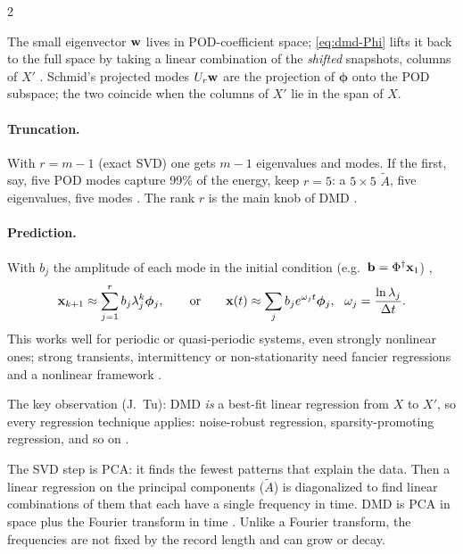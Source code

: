 \begin{paracol}{2}
\begin{intuition}
The small eigenvector $\mathbf{w}$ lives in POD-coefficient space; \eqref{eq:dmd-Phi} lifts it back to the
full space by taking a linear combination of the \emph{shifted} snapshots, columns of $X'$
. Schmid's projected modes $U_r\mathbf{w}$ are the projection of $\boldsymbol\phi$ onto the POD
subspace; the two coincide when the columns of $X'$ lie in the span of $X$.
\end{intuition}

\paragraph{Truncation.} With $r=m-1$ (exact SVD) one gets $m-1$ eigenvalues and modes. If the first,
say, five POD modes capture 99\% of the energy, keep $r=5$: a $5\times5$ $\tilde A$, five eigenvalues,
five modes . The rank $r$ is the main knob of DMD .

\paragraph{Prediction.} With $b_j$ the amplitude of each mode in the initial condition (e.g.\
$\mathbf{b}=\Phi^\dagger\mathbf{x}_1$) ,
\begin{equation}\label{eq:dmd-pred}
  \vb x_{k+1}\approx\sum_{j=1}^r b_j\lambda_j^{k}\boldsymbol\phi_j,
  \qquad\text{or}\qquad
  \vb x(t)\approx\sum_j b_j e^{\omega_jt}\boldsymbol\phi_j,\ \ \omega_j=\frac{\ln\lambda_j}{\Delta t}.
\end{equation}
This works well for periodic or quasi-periodic systems, even strongly nonlinear ones; strong transients,
intermittency or non-stationarity need fancier regressions and a nonlinear framework \ts{4}{1}{14:49}.

\begin{remark}
The key observation (J.~Tu): DMD \emph{is} a best-fit linear regression from $X$ to $X'$, so every
regression technique applies: noise-robust regression, sparsity-promoting regression, and so on
\ts{4}{1}{15:30}\ts{4}{1}{15:50}.
\end{remark}

\begin{intuition}
The SVD step is PCA: it finds the fewest patterns that explain the data. Then a linear regression on the
principal components ($\tilde A$) is diagonalized to find linear combinations of them that each have a
single frequency in time. DMD is PCA in space plus the Fourier transform in time \ts{4}{1}{16:11}.
Unlike a Fourier transform, the frequencies are not fixed by the record length and can grow or decay.
\end{intuition}


\end{paracol}
